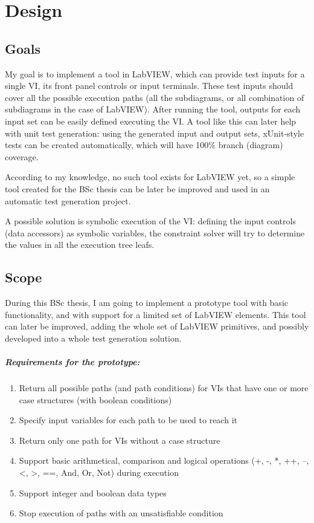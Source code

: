 \chapter{Design}
\section{Goals}
My goal is to implement a tool in LabVIEW, which can provide test inputs for a single VI, its front panel controls or input terminals. These test inputs should cover all the possible execution paths (all the subdiagrams, or all combination of subdiagrams in the case of LabVIEW). After running the tool, outputs for each input set can be easily defined executing the VI. A tool like this can later help with unit test generation: using the generated input and output sets, xUnit-style tests can be created automatically, which will have 100\% branch (diagram) coverage.

According to my knowledge, no such tool exists for LabVIEW yet, so a simple tool created for the BSc thesis can be later be improved and used in an automatic test generation project.

A possible solution is symbolic execution of the VI: defining the input controls (data accessors) as symbolic variables, the constraint solver will try to determine the values in all the execution tree leafs.
\section{Scope}
During this BSc thesis, I am going to implement a prototype tool with basic functionality, and with support for a limited set of LabVIEW elements. This tool can later be improved, adding the whole set of LabVIEW primitives, and possibly developed into a whole test generation solution. 

\paragraph{Requirements for the prototype:}
\begin{enumerate}
\item Return all possible paths (and path conditions) for VIs that have one or more case structures (with boolean conditions)
\item Specify input variables for each path to be used to reach it
\item Return only one path for VIs without a case structure
\item Support basic arithmetical, comparison and logical operations (+, -, *, ++, --, <, >, ==, And, Or, Not) during execution
\item Support integer and boolean data types
\item Stop execution of paths with an unsatisfiable condition
\end{enumerate}

